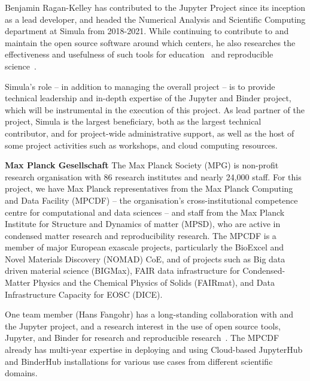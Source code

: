 Benjamin Ragan-Kelley has contributed to the Jupyter Project since its
inception as a lead developer, and headed the Numerical Analysis and
Scientific Computing department at Simula from 2018-2021.
While continuing to contribute to and maintain the
open source software around which \TheProject centers,
he also researches the effectiveness and usefulness of such tools for education~\cite{JupyterHub-for-education-2016}
and reproducible science~\cite{binder,Forde2018ReproducibleRE,nbval-arxiv,repo2docker-checker2020,Beg2021}.

Simula's role -- in addition to managing the overall project -- is to provide
technical leadership and in-depth expertise of the Jupyter and Binder project, which will be
instrumental in the execution of this project.
As lead partner of the project,
Simula is the largest beneficiary, both as the largest technical contributor,
and for project-wide administrative support,
as well as the host of some project activities such as workshops,
and cloud computing resources.

\noindent \textbf{Max Planck Gesellschaft}
The Max Planck Society (MPG) is non-profit research
organisation with 86 research institutes and nearly 24,000 staff. For this
project, we have Max Planck representatives from the Max Planck Computing and Data
Facility (MPCDF) -- the organisation's cross-institutional competence centre
for computational and data sciences -- and staff from the Max Planck Institute
for Structure and Dynamics of matter (MPSD), who are active in condensed matter research and
reproducibility research.
%
The MPCDF is a member of major European exascale projects, particularly the
BioExcel and Novel Materials Discovery (NOMAD) CoE, and of projects
such as Big data driven material science (BIGMax), FAIR data infrastructure for
Condensed-Matter Physics and the Chemical Physics of Solids (FAIRmat), and Data
Infrastructure Capacity for EOSC (DICE).

One team member (Hans Fangohr) has a long-standing collaboration with 
and the Jupyter project, and a research interest in the use of open source
tools, Jupyter, and Binder for research and reproducible
research~\cite{Fangohr:ICALEPCS2017-TUCPA01,Fangohr2020,nbval-arxiv,Beg2021}.
The MPCDF already has multi-year expertise in deploying and using Cloud-based
JupyterHub and BinderHub installations for various use cases from different
scientific domains.

